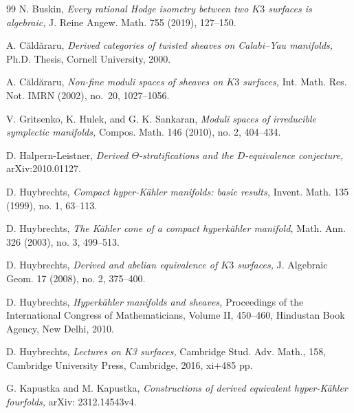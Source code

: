 \documentclass[11pt]{amsart}
\theoremstyle{plain}
\theoremstyle{definition}
\theoremstyle{remark}
\newcommand{\BP}{{\mathbb{P}}}
\begin{document}
\begin{thebibliography}{99}
 N. Buskin, {\em Every rational Hodge isometry between two $K3$ surfaces is algebraic,} J. Reine Angew. Math. 755 (2019), 127--150.

 A. C\u{a}ld\u{a}raru, {\em Derived categories of twisted sheaves on Calabi--Yau manifolds,} Ph.D. Thesis, Cornell University, 2000.

 A. C\u{a}ld\u{a}raru, {\em Non-fine moduli spaces of sheaves on $K3$ surfaces,} Int. Math. Res. Not. IMRN (2002), no.~20, 1027--1056.


 V. Gritsenko, K. Hulek, and G. K. Sankaran, {\em Moduli spaces of irreducible symplectic manifolds,} Compos. Math. 146 (2010), no. 2, 404--434.

 D. Halpern-Leistner, {\em Derived $\Theta$-stratifications and the $D$-equivalence conjecture,} arXiv:2010.01127.

 D. Huybrechts, {\em Compact hyper-K\"ahler manifolds: basic results,} Invent. Math. 135 (1999), no. 1, 63--113.

 D. Huybrechts, {\em The K\"ahler cone of a compact hyperk\"ahler manifold,} Math. Ann. 326 (2003), no. 3, 499--513.

 D. Huybrechts, {\em Derived and abelian equivalence of $K3$ surfaces,} J. Algebraic Geom. 17 (2008), no. 2, 375--400.

 D. Huybrechts, {\em Hyperk\"ahler manifolds and sheaves,} Proceedings of the International Congress of Mathematicians, Volume II, 450--460, Hindustan Book Agency, New Delhi, 2010.

 D. Huybrechts, {\em Lectures on K3 surfaces,} Cambridge Stud. Adv. Math., 158, Cambridge University Press, Cambridge, 2016, xi+485 pp.




 G. Kapustka and M. Kapustka, {\em Constructions of derived equivalent hyper-K\"ahler fourfolds,} arXiv: 2312.14543v4.


\end{thebibliography}
\end{document}
